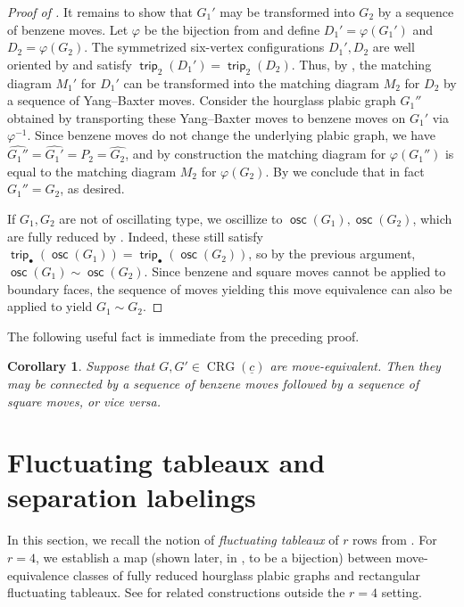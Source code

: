 \documentclass{amsart}
\newtheorem{corollary}[theorem]{Corollary}
\theoremstyle{definition}
\theoremstyle{remark}
\numberwithin{equation}{section}
\DeclareMathOperator{\trip}{\mathsf{trip}}
\DeclareMathOperator{\osc}{\mathsf{osc}}
\DeclareMathOperator{\crg}{CRG}
\begin{document}
\begin{proof}[Proof of ]
It remains to show that $G_1'$ may be transformed into $G_2$ by a sequence of benzene moves. Let $\varphi$ be the bijection from  and define $D_1'=\varphi(G_1')$ and $D_2=\varphi(G_2)$. The symmetrized six-vertex configurations $D_1',D_2$ are well oriented by  and satisfy $\trip_2(D_1')=\trip_2(D_2)$. Thus, by , the matching diagram $M_1'$ for $D_1'$ can be transformed into the matching diagram $M_2$ for $D_2$ by a sequence of Yang--Baxter moves. Consider the hourglass plabic graph $G_1''$ obtained by transporting these Yang--Baxter moves to benzene moves on $G_1'$ via $\varphi^{-1}$. Since benzene moves do not change the underlying plabic graph, we have $\widehat{G_1''}=\widehat{G_1'}=P_2=\widehat{G_2}$, and by construction the matching diagram for $\varphi(G_1'')$ is equal to the matching diagram $M_2$ for $\varphi(G_2)$. By  we conclude that in fact $G_1''=G_2$, as desired.

If $G_1,G_2$ are not of oscillating type, we oscillize to $\osc(G_1),\osc(G_2)$, which are fully reduced by . Indeed, these still satisfy $\trip_{\bullet}(\osc(G_1))=\trip_{\bullet}(\osc(G_2))$, so by the previous argument, $\osc(G_1) \sim \osc(G_2)$. Since benzene and square moves cannot be applied to boundary faces, the sequence of moves yielding this move equivalence can also be applied to yield $G_1 \sim G_2$.
\end{proof}

The following useful fact is immediate from the preceding proof.

\begin{corollary}
\label{cor:benzene-then-square}
Suppose that $G, G' \in \crg(\underline{c})$ are move-equivalent. Then they may be connected by a sequence of benzene moves followed by a sequence of square moves, or vice versa.
\end{corollary}

\section{Fluctuating tableaux and separation labelings}
\label{sec:backwards-map}

In this section, we recall the notion of \emph{fluctuating tableaux} of $r$ rows from \cite{fluctuating-paper}. For $r = 4$, we establish a map (shown later, in , to be a bijection) between move-equivalence classes of fully reduced hourglass plabic graphs and rectangular fluctuating tableaux. See  for related constructions outside the $r=4$ setting.
\end{document}
